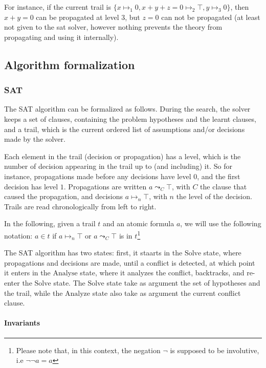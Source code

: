 For instance, if the current trail is $\{x \mapsto_1 0, x + y + z = 0 \mapsto_2 \top, y\mapsto_3 0\}$,
then $x + y = 0$ can be propagated at level $3$, but $z = 0$ can not be propagated (at least not
given to the sat solver, however nothing prevents the theory from propagating and using it internally).

\subsection{Algorithm formalization}

\subsubsection{SAT}

The SAT algorithm can be formalized as follows. During the search, the solver keeps
a set of clauses, containing the problem hypotheses and the learnt clauses, and
a trail, which is the current ordered list of assumptions and/or decisions made by
the solver.

Each element in the trail (decision or propagation) has a level, which is the number of decision
appearing in the trail up to (and including) it. So for instance, propagations made before any
decisions have level $0$, and the first decision has level $1$. Propagations are written
$a \leadsto_C \top$, with $C$ the clause that caused the propagation, and decisions
$a \mapsto_n \top$, with $n$ the level of the decision. Trails are read
chronologically from left to right.

In the following, given a trail $t$ and an atomic formula $a$, we will use the following notation:
$a \in t$ if $a \mapsto_n \top$ or $a \leadsto_C \top$ is in $t$\footnote{Please note that, in
this context, the negation $\neg$ is supposed to be involutive, i.e $\neg \neg a = a$}

The SAT algorithm has two states: first, it staarts in the $\text{Solve}$ state, where propagations
and decisions are made, until a conflict is detected, at which point it enters in the $\text{Analyse}$
state, where it analyzes the conflict, backtracks, and re-enter the $\text{Solve}$ state.
The $\text{Solve}$ state take as argument the set of hypotheses and the trail, while
the $\text{Analyze}$ state also take as argument the current conflict clause.

\paragraph{Invariants}

